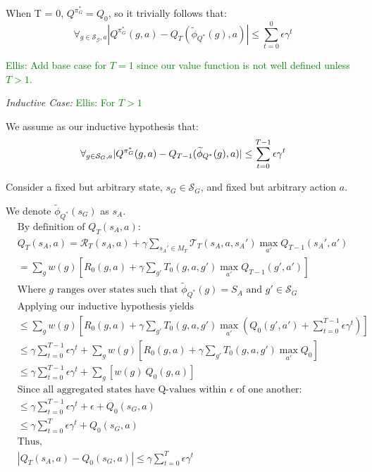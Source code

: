 \documentclass{article}
\newcommand{\ep}{\widetilde \phi}
\newcommand{\epQ}{\ep_{Q^*}}
\newcommand\enote[1]{\textcolor{green}{Ellis: #1}}
\begin{document}
When T = 0, $Q^{\pi_G^*} = Q_0$, so it trivially follows that:
\begin{equation}
\forall_{g\in \mathcal{S_G}, a} |Q^{\pi_G^*}(g, a) - Q_T(\ep_{Q^*}(g), a)| \leq \sum_{t=0}^{0} \epsilon \gamma^t
\end{equation}

\enote{Add base case for $T=1$ since our value function is not well defined unless $T > 1$.}

\textit{Inductive Case:} \enote {For $T>1$}

We assume as our inductive hypothesis that:
\begin{equation}
\forall_{g \in \mathcal{S}_G, a} |Q^{\pi_G^*}(g, a) - Q_{T-1}(\epQ(g), a)| \leq \sum_{t=0}^{T-1} \epsilon \gamma^t\\
\end{equation}

Consider a fixed but arbitrary state, $s_G \in \mathcal{S}_G$, and fixed but arbitrary action $a$.

We denote $\epQ(s_G)$ as $s_A$.
\begin{align*}
&\text{By definition of $Q_{T}(s_A, a)$:}\\
&Q_T(s_A, a) = \mathcal{R}_T(s_A,a) + \gamma \sum_{{s_A}' \in M_T} \mathcal{T}_T(s_A,a,{s_A}') \max_{a'} Q_{T-1}({s_A}',a')\\
&=\sum_{g}w(g)\left[ R_0(g,a) + \gamma \sum_{g'} T_0(g,a,g') \max_{a'} Q_{T-1}(g', a')      \right]\\
&\text{Where $g$ ranges over states such that $\epQ(g) = S_A$ and $g' \in \mathcal{S}_G$}\\
&\text{Applying our inductive hypothesis yields}\\
&\leq \sum_{g}w(g)\left[ R_0(g,a) + \gamma \sum_{g'} T_0(g,a,g') \max_{a'}(Q_0(g', a') + \sum_{t=0}^{T-1} \epsilon \gamma^t)      \right]\\
&\leq \gamma\sum_{t=0}^{T-1} \epsilon \gamma^t + \sum_{g}w(g)\left[ R_0(g,a) + \gamma \sum_{g'} T_0(g,a,g') \max_{a'}Q_0      \right]\\
&\leq \gamma\sum_{t=0}^{T-1} \epsilon \gamma^t + \sum_{g}\left[ w(g)\ Q_0(g,a)\right]\\
&\text{Since all aggregated states have Q-values within $\epsilon$ of one another:}\\
&\leq \gamma\sum_{t=0}^{T-1} \epsilon \gamma^t + \epsilon + Q_0(s_G, a)\\
&\leq \gamma\sum_{t=0}^{T} \epsilon \gamma^t + Q_0(s_G, a)\\
&\text{Thus,}\\
&\left| Q_{T}(s_A, a) - Q_0(s_G,a) \right| \leq \gamma\sum_{t=0}^{T}\epsilon \gamma^t
\end{align*}
\end{document}
